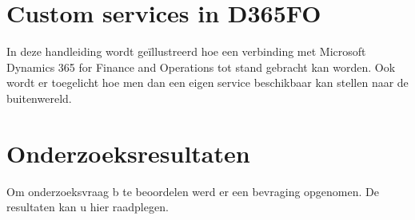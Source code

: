 \documentclass{bachproef-tin}
\begin{document}
    \chapter{Custom services in D365FO}
    In deze handleiding wordt geïllustreerd hoe een verbinding met Microsoft Dynamics 365 for Finance and Operations tot stand gebracht kan worden. Ook wordt er toegelicht hoe men dan een eigen service beschikbaar kan stellen naar de buitenwereld. 
    
    
    \chapter{Onderzoeksresultaten}
    Om onderzoeksvraag b te beoordelen werd er een bevraging opgenomen. De resultaten kan u hier raadplegen. 
    
    
    \printbibliography[heading=bibintoc]
    
\end{document}
